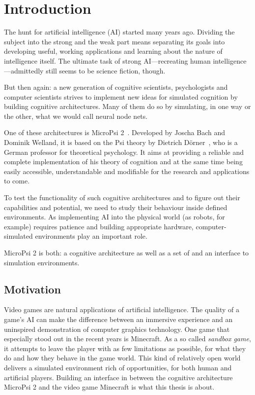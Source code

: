 \chapter{Introduction}


The hunt for artificial intelligence (AI) started many years ago. Dividing the subject into the strong and the weak part means separating its goals into developing useful, working applications and learning about the nature of intelligence itself. The ultimate task of strong AI---recreating human intelligence---admittedly still seems to be science fiction, though.


But then again: a new generation of cognitive scientists, psychologists and computer scientists strives to implement new ideas for simulated cognition by building cognitive architectures. Many of them do so by simulating, in one way or the other, what we would call neural node nets.

One of these architectures is MicroPsi 2~\cite{conf/agi/Bach12}. Developed by Joscha Bach and Dominik Welland, it is based on the Psi theory by Dietrich Dörner~\cite{Doerner98}, who is a German professor for theoretical psychology. It aims at providing a reliable and complete implementation of his theory of cognition and at the same time being easily accessible, understandable and modifiable for the research and applications to come.

To test the functionality of such cognitive architectures and to figure out their capabilities and potential, we need to study their behaviour inside defined environments. As implementing AI into the physical world (as robots, for example) requires patience and building appropriate hardware, computer-simulated environments play an important role.

MicroPsi 2 is both: a cognitive architecture as well as a set of and an interface to simulation environments.

\section{Motivation}
Video games are natural applications of artificial intelligence. The quality of a game's AI can make the difference between an immersive experience and an uninspired demonstration of computer graphics technology. One game that especially stood out in the recent years is Minecraft. As a so called \emph{sandbox game}, it attempts to leave the player with as few limitations as possible, for what they do and how they behave in the game world. This kind of relatively open world delivers a simulated environment rich of opportunities, for both human and artificial players. Building an interface in between the cognitive architecture MicroPsi 2 and the video game Minecraft is what this thesis is about.


